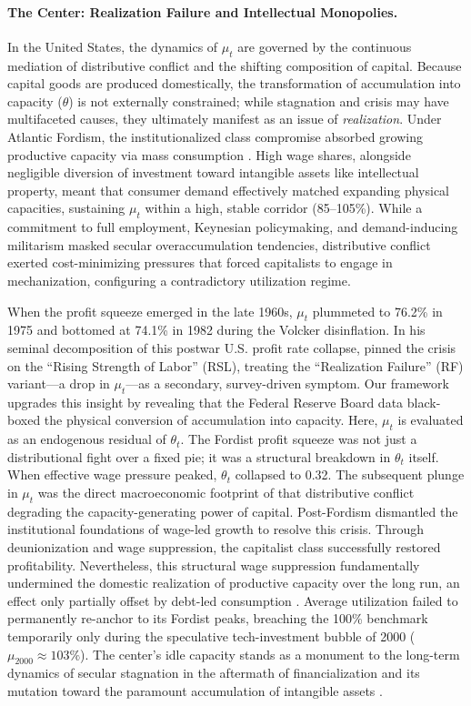 \paragraph{The Center: Realization Failure and Intellectual Monopolies.} 
In the United States, the dynamics of $\mu_t$ are governed by the continuous mediation of distributive conflict and the shifting composition of capital. Because capital goods are produced domestically, the transformation of accumulation into capacity ($\theta$) is not externally constrained; while stagnation and crisis may have multifaceted causes, they ultimately manifest as an issue of \textit{realization}. Under Atlantic Fordism, the institutionalized class compromise absorbed growing productive capacity via mass consumption \citep{Aglietta2000}. High wage shares, alongside negligible diversion of investment toward intangible assets like intellectual property, meant that consumer demand effectively matched expanding physical capacities, sustaining $\mu_t$ within a high, stable corridor (85--105\%). While a commitment to full employment, Keynesian policymaking, and demand-inducing militarism masked secular overaccumulation tendencies, distributive conflict exerted cost-minimizing pressures that forced capitalists to engage in mechanization, configuring a contradictory utilization regime. 

When the profit squeeze emerged in the late 1960s, $\mu_t$ plummeted to 76.2\% in 1975 and bottomed at 74.1\% in 1982 during the Volcker disinflation. In his seminal decomposition of this postwar U.S. profit rate collapse, \citet{Weisskopf1979} pinned the crisis on the ``Rising Strength of Labor'' (RSL), treating the ``Realization Failure'' (RF) variant—a drop in $\mu_t$—as a secondary, survey-driven symptom. Our framework upgrades this insight by revealing that the Federal Reserve Board data black-boxed the physical conversion of accumulation into capacity. Here, $\mu_t$ is evaluated as an endogenous residual of $\theta_t$. The Fordist profit squeeze was not just a distributional fight over a fixed pie; it was a structural breakdown in $\theta_t$ itself. When effective wage pressure peaked, $\theta_t$ collapsed to 0.32. The subsequent plunge in $\mu_t$ was the direct macroeconomic footprint of that distributive conflict degrading the capacity-generating power of capital. Post-Fordism dismantled the institutional foundations of wage-led growth to resolve this crisis. Through deunionization and wage suppression, the capitalist class successfully restored profitability. Nevertheless, this structural wage suppression fundamentally undermined the domestic realization of productive capacity over the long run, an effect only partially offset by debt-led consumption \citep{Stockhammer2012,Vidal2019}. Average utilization failed to permanently re-anchor to its Fordist peaks, breaching the 100\% benchmark temporarily only during the speculative tech-investment bubble of 2000 ($\mu_{2000} \approx 103\%$). The center's idle capacity stands as a monument to the long-term dynamics of secular stagnation in the aftermath of financialization and its mutation toward the paramount accumulation of intangible assets \citep{Rikap2021, Rotta2018}.

